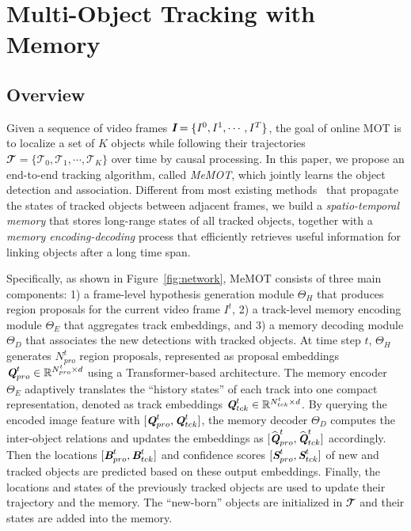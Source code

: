 \section{Multi-Object Tracking with Memory}
\label{sec:method}

\subsection{Overview}
\label{sec:method:overview}

Given a sequence of video frames $\textbf{\em I} = \{I^0, I^1, \cdots, I^T\}$,
the goal of online MOT is to localize a set of $K$ objects while following their trajectories $\mathbfcal{T} = \{\mathcal{T}_0, \mathcal{T}_1, \cdots, \mathcal{T}_K\}$ over time by causal processing.
In this paper, we propose an end-to-end tracking algorithm, called \textit{MeMOT}, which jointly learns the object detection and association.
Different from most existing methods~\cite{bergmann2019tracking} that propagate the states of tracked objects between adjacent frames,
we build a \textit{spatio-temporal memory} that stores long-range states of all tracked objects, together with a \textit{memory encoding-decoding} process that efficiently retrieves useful information for linking objects after a long time span.

Specifically, as shown in Figure~\ref{fig:network}, MeMOT consists of three main components:
1) a frame-level hypothesis generation module $\Theta_H$ that produces region proposals for the current video frame $I^t$,
2) a track-level memory encoding module $\Theta_E$ that aggregates track embeddings,
and 3) a memory decoding module $\Theta_D$ that associates the new detections with tracked objects.
At time step $t$,
$\Theta_H$ generates $N^t_{pro}$ region proposals, represented as proposal embeddings $\textbf{\em Q}_{pro}^t \in \mathbb{R}^{N^t_{pro} \times d}$ using a Transformer-based architecture.
The memory encoder $\Theta_E$ adaptively translates the ``history states'' of each track into one compact representation, denoted as track embeddings $\textbf{\em Q}_{tck}^t \in \mathbb{R}^{N^t_{tck} \times d}$. 
By querying the encoded image feature with $[\textbf{\em Q}_{pro}^t, \textbf{\em Q}_{tck}^t]$,
the memory decoder $\Theta_D$ computes the inter-object relations and updates the embeddings as $[\widehat{\textbf{\em Q}}_{pro}^t, \widehat{\textbf{\em Q}}_{tck}^t]$ accordingly.
Then the locations $[\textbf{\em B}_{pro}^t, \textbf{\em B}_{tck}^t]$ and confidence scores  $[\textbf{\em S}_{pro}^t, \textbf{\em S}_{tck}^t]$ of new and tracked objects are predicted based on these output embeddings.
Finally, the locations and states of the previously tracked objects are used to update their trajectory and the memory.
The ``new-born'' objects are initialized in $\mathbfcal{T}$ and their states are added into the memory.

